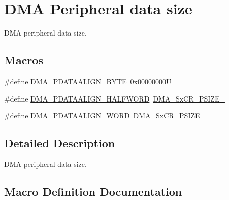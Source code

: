 \hypertarget{group___d_m_a___peripheral__data__size}{}\section{D\+MA Peripheral data size}
\label{group___d_m_a___peripheral__data__size}


D\+MA peripheral data size.  


\subsection*{Macros}
\begin{DoxyCompactItemize}
\item 
\#define \mbox{\hyperlink{group___d_m_a___peripheral__data__size_ga55b8c8f5ec95f10d26d6c5b1c9136730}{D\+M\+A\+\_\+\+P\+D\+A\+T\+A\+A\+L\+I\+G\+N\+\_\+\+B\+Y\+TE}}~0x00000000U
\item 
\#define \mbox{\hyperlink{group___d_m_a___peripheral__data__size_gac08bfd907442dba5358830b247135bcc}{D\+M\+A\+\_\+\+P\+D\+A\+T\+A\+A\+L\+I\+G\+N\+\_\+\+H\+A\+L\+F\+W\+O\+RD}}~\mbox{\hyperlink{group___peripheral___registers___bits___definition_gab05cf3e3f7c9edae5c70d59b3b75b14f}{D\+M\+A\+\_\+\+Sx\+C\+R\+\_\+\+P\+S\+I\+Z\+E\+\_}}
\item 
\#define \mbox{\hyperlink{group___d_m_a___peripheral__data__size_gaad50e97cbc4a726660db9c3f42ac93b0}{D\+M\+A\+\_\+\+P\+D\+A\+T\+A\+A\+L\+I\+G\+N\+\_\+\+W\+O\+RD}}~\mbox{\hyperlink{group___peripheral___registers___bits___definition_ga8f376d0900380a3045cbeadd6a037302}{D\+M\+A\+\_\+\+Sx\+C\+R\+\_\+\+P\+S\+I\+Z\+E\+\_}}
\end{DoxyCompactItemize}


\subsection{Detailed Description}
D\+MA peripheral data size. 



\subsection{Macro Definition Documentation}
\mbox{\label{group___d_m_a___peripheral__data__size_ga55b8c8f5ec95f10d26d6c5b1c9136730}} 
